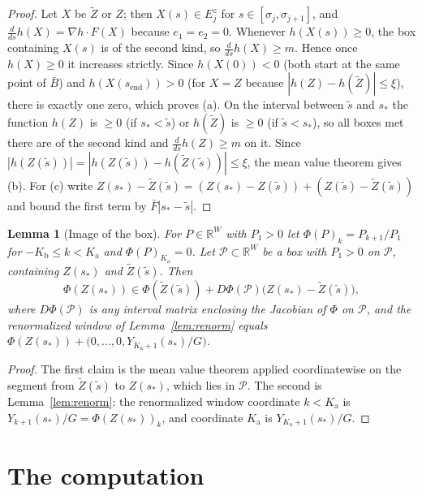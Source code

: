 \documentclass[12pt,reqno]{amsart}
\numberwithin{equation}{section}
\theoremstyle{plain}
\newtheorem{lemma}[theorem]{Lemma}
\theoremstyle{definition}
\theoremstyle{remark}
\newcommand{\Kb}{K_{\mathrm b}}
\newcommand{\Ka}{K_{\mathrm a}}
\newcommand{\send}{s_{\mathrm{end}}}
\newcommand{\R}{\mathbb{R}}
\begin{document}
\begin{proof}
Let $X$ be $\tilde Z$ or $Z$; then $X(s)\in E_j^z$ for $s\in[\sigma_j,\sigma_{j+1}]$, and
$\frac{d}{ds}h(X)=\nabla h\cdot F(X)$ because $e_1=e_2=0$. Whenever $h(X(s))\ge0$,
the box containing $X(s)$ is of the second kind, so $\frac{d}{ds}h(X)\ge m$.
Hence once $h(X)\ge0$ it increases strictly. Since $h(X(0))<0$ (both
start at the same point of $\bar B$) and $h(X(\send))>0$ (for $X=Z$ because
$|h(Z)-h(\tilde Z)|\le\xi$), there is exactly one zero, which proves (a). On the interval between
$\tilde s$ and $s_*$ the function $h(Z)$ is $\ge0$ (if $s_*<\tilde s$) or $h(\tilde Z)$ is
$\ge0$ (if $\tilde s<s_*$), so all boxes met there are of the second kind and
$\frac{d}{ds}h(Z)\ge m$ on it. Since $|h(Z(\tilde s))|=|h(Z(\tilde s))-h(\tilde Z(\tilde s))|\le\xi$,
the mean value theorem gives (b). For (c) write
$Z(s_*)-\tilde Z(\tilde s)=(Z(s_*)-Z(\tilde s))+(Z(\tilde s)-\tilde Z(\tilde s))$ and bound the first
term by $\bar F|s_*-\tilde s|$.
\end{proof}

\begin{lemma}[Image of the box]\label{lem:image}
For $P\in\R^W$ with $P_1>0$ let $\Phi(P)_k=P_{k+1}/P_1$ for $-\Kb\le k<\Ka$ and
$\Phi(P)_{\Ka}=0$. Let $\mathcal P\subset\R^W$ be a box with $P_1>0$ on $\mathcal P$,
containing $Z(s_*)$ and $\tilde Z(\tilde s)$. Then
\[
  \Phi(Z(s_*))\in\Phi(\tilde Z(\tilde s))+D\Phi(\mathcal P)\bigl(Z(s_*)-\tilde Z(\tilde s)\bigr),
\]
where $D\Phi(\mathcal P)$ is any interval matrix enclosing the Jacobian of $\Phi$ on $\mathcal P$,
and the renormalized window of Lemma~\ref{lem:renorm} equals
$\Phi(Z(s_*))+\bigl(0,\dots,0,Y_{\Ka+1}(s_*)/G\bigr)$.
\end{lemma}

\begin{proof}
The first claim is the mean value theorem applied coordinatewise on the
segment from $\tilde Z(\tilde s)$ to $Z(s_*)$, which lies in $\mathcal P$. The second is
Lemma~\ref{lem:renorm}: the renormalized window coordinate $k<\Ka$ is
$Y_{k+1}(s_*)/G=\Phi(Z(s_*))_k$, and coordinate $\Ka$ is $Y_{\Ka+1}(s_*)/G$.
\end{proof}

\section{The computation}\label{sec:computation}
\end{document}

